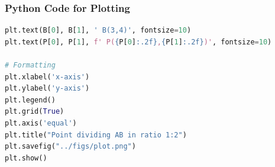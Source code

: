 \documentclass{beamer}
\theoremstyle{remark}
\numberwithin{equation}{section}
\begin{document}
\begin{frame}[fragile]
\frametitle{Python Code for Plotting}
\begin{lstlisting}[language=Python]
plt.text(B[0], B[1], ' B(3,4)', fontsize=10)
plt.text(P[0], P[1], f' P({P[0]:.2f},{P[1]:.2f})', fontsize=10)

# Formatting
plt.xlabel('x-axis')
plt.ylabel('y-axis')
plt.legend()
plt.grid(True)
plt.axis('equal')
plt.title("Point dividing AB in ratio 1:2")
plt.savefig("../figs/plot.png")
plt.show()

\end{lstlisting}
\end{frame}
\end{document}
